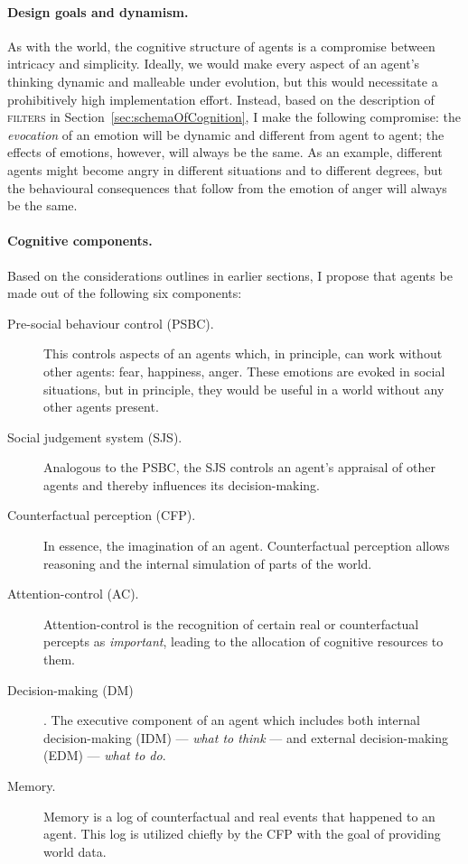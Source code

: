 \paragraph{Design goals and dynamism.} As with the world, the cognitive structure of agents is a compromise between intricacy and simplicity. Ideally, we would make every aspect of an agent's thinking dynamic and malleable under evolution, but this would necessitate a prohibitively high implementation effort. Instead, based on the description of \textsc{filters} in Section~\ref{sec:schemaOfCognition}, I make the following compromise: the {\em evocation} of an emotion will be dynamic and different from agent to agent; the effects of emotions, however, will always be the same. As an example, different agents might become angry in different situations and to different degrees, but the behavioural consequences that follow from the emotion of anger will always be the same.

\paragraph{Cognitive components.} Based on the considerations outlines in earlier sections, I propose that agents be made out of the following six components:

\begin{description}
	\item[Pre-social behaviour control (PSBC).] This controls aspects of an agents which, in principle, can work without other agents: fear, happiness, anger.  These emotions are evoked in social situations, but in principle, they would be useful in a world without any other agents present.
	\item[Social judgement system (SJS).] Analogous to the \textsc{PSBC}, the \textsc{SJS} controls an agent's appraisal of other agents and thereby influences its decision-making.
	\item[Counterfactual perception (CFP).] In essence, the imagination of an agent. Counterfactual perception allows reasoning and the internal simulation of parts of the world.
	\item[Attention-control (AC).] Attention-control is the recognition of certain real or counterfactual percepts as {\em important}, leading to the allocation of cognitive resources to them.
	\item[Decision-making (DM)]. The executive component of an agent which includes both internal decision-making (IDM) --- {\em what to think} --- and external decision-making (EDM) --- {\em what to do}.
	\item[Memory.] Memory is a log of counterfactual and real events that happened to an agent. This log is utilized chiefly by the \textsc{CFP} with the goal of providing world data.
\end{description}

